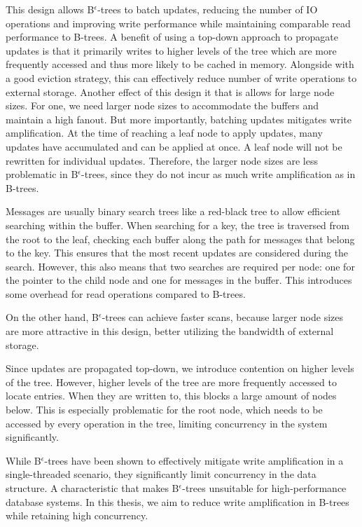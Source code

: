 This design allows B$^\epsilon$-trees to batch updates, reducing the number of \ac{IO} operations and improving write performance while maintaining comparable read performance to B-trees.
A benefit of using a top-down approach to propagate updates is that it primarily writes to higher levels of the tree which are more frequently accessed and thus more likely to be cached in memory.
Alongside with a good eviction strategy, this can effectively reduce number of write operations to external storage.
Another effect of this design it that is allows for large node sizes.
For one, we need larger node sizes to accommodate the buffers and maintain a high fanout.
But more importantly, batching updates mitigates write amplification.
At the time of reaching a leaf node to apply updates, many updates have accumulated and can be applied at once. 
A leaf node will not be rewritten for individual updates. 
Therefore, the larger node sizes are less problematic in B$^\epsilon$-trees, since they do not incur as much write amplification as in B-trees.

Messages are usually binary search trees like a red-black tree to allow efficient searching within the buffer.
When searching for a key, the tree is traversed from the root to the leaf, checking each buffer along the path for messages that belong to the key.
This ensures that the most recent updates are considered during the search.
However, this also means that two searches are required per node: one for the pointer to the child node and one for messages in the buffer.
This introduces some overhead for read operations compared to B-trees.

On the other hand, B$^\epsilon$-trees can achieve faster scans, because larger node sizes are more attractive in this design, better utilizing the bandwidth of external storage.

Since updates are propagated top-down, we introduce contention on higher levels of the tree.
However, higher levels of the tree are more frequently accessed to locate entries.
When they are written to, this blocks a large amount of nodes below.
This is especially problematic for the root node, which needs to be accessed by every operation in the tree, limiting concurrency in the system significantly.

While B$^\epsilon$-trees have been shown to effectively mitigate write amplification in a single-threaded scenario, they significantly limit concurrency in the data structure.
A characteristic that makes B$^\epsilon$-trees unsuitable for high-performance database systems.
In this thesis, we aim to reduce write amplification in B-trees while retaining high concurrency.



